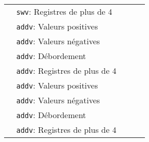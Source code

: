 \documentclass[a11paper]{article}
\newcommand{\cbox}{\fbox{\phantom{\ding{51}}}}
\newcounter{tid}
\newcommand{\tid}{\stepcounter{tid}\thetid}
\begin{document}
\begin{center}
\begin{longtable}{lp{5cm}p{4cm}p{4cm}l}
		\tid                               & \verb|swv|:
		Registres de plus de 4             &
		                                   &
		                                   &
		\cbox
		\\ %
		\tid                               & \verb|addv|:
		Valeurs positives                  &
		                                   &
		                                   &
		\cbox
		\\

		\tid                               & \verb|addv|:
		Valeurs négatives                  &
		                                   &
		                                   &
		\cbox
		\\

		\tid                               & \verb|addv|:
		Débordement                        &
		                                   &
		                                   &
		\cbox
		\\

		\tid                               & \verb|addv|:
		Registres de plus de 4             &
		                                   &
		                                   &
		\cbox
		\\ %
		\tid                               & \verb|addv|:
		Valeurs positives                  &
		                                   &
		                                   &
		\cbox
		\\

		\tid                               & \verb|addv|:
		Valeurs négatives                  &
		                                   &
		                                   &
		\cbox
		\\

		\tid                               & \verb|addv|:
		Débordement                        &
		                                   &
		                                   &
		\cbox
		\\

		\tid                               & \verb|addv|:
		Registres de plus de 4             &
		                                   &
		                                   &
		\cbox
		\\ %
	\end{longtable}
\end{center}
\end{document}
